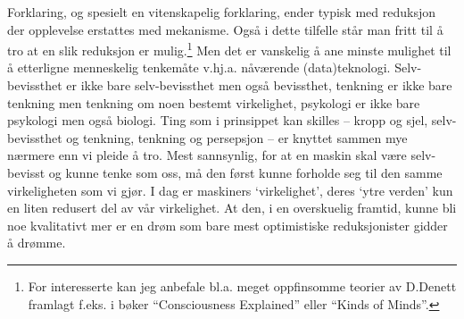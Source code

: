 \documentclass[10pt,twocolumn]{article}
\newcommand{\<}{\langle}
\renewcommand{\>}{\rangle}
\begin{document}
Forklaring, og spesielt en vitenskapelig forklaring, ender typisk med 
reduksjon der opplevelse erstattes med mekanisme. Ogs{\aa} i dette tilfelle 
st{\aa}r man fritt til 
{\aa} tro at en slik reduksjon er mulig.\footnote{For 
interesserte kan jeg anbefale bl.a. meget 
oppfinsomme teorier av D.Denett framlagt f.eks. i  b{\o}ker 
``Consciousness Explained'' eller ``Kinds of Minds''.} 
Men det er vanskelig {\aa} ane minste mulighet til {\aa} etterligne 
menneskelig tenkem{\aa}te v.hj.a. n{\aa}v{\ae}rende (data)teknologi. 
Selv-bevissthet er ikke bare selv-bevissthet men ogs{\aa} bevissthet,
tenkning er ikke bare tenkning men tenkning om noen
bestemt virkelighet, psykologi er ikke bare psykologi men ogs{\aa} biologi. 
Ting som i prinsippet kan skilles 
-- kropp og sjel, selv-bevissthet og tenkning, tenkning og persepsjon -- 
er knyttet sammen mye n{\ae}rmere enn vi pleide {\aa} tro.
Mest sannsynlig, for at en maskin skal v{\ae}re selv-bevisst og 
kunne tenke som oss, m{\aa} 
den f{\o}rst kunne forholde seg til den samme virkeligheten som vi gj{\o}r. 
I dag er maskiners `virkelighet', deres `ytre verden' kun en liten 
redusert del av v{\aa}r virkelighet. At den, i en overskuelig framtid, kunne bli noe
kvalitativt mer er en dr{\o}m 
som bare mest optimistiske reduksjonister gidder {\aa} dr{\o}mme.
\end{document}
